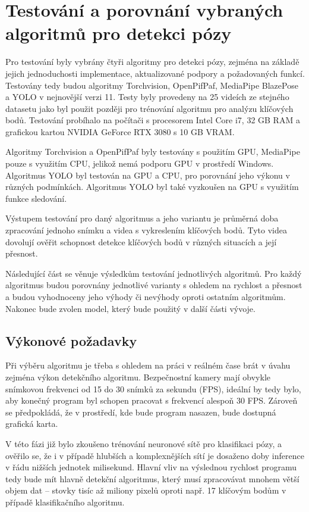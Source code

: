 \section{Testování a porovnání vybraných algoritmů pro detekci pózy}

Pro testování byly vybrány čtyři algoritmy pro detekci pózy, zejména na základě
jejich jednoduchosti implementace, aktualizované podpory a požadovaných funkcí.
Testovány tedy budou algoritmy Torchvision, OpenPifPaf, MediaPipe BlazePose a
YOLO v nejnovější verzi 11. Testy byly provedeny na 25 videích ze stejného
datasetu jako byl použit později pro trénování algoritmu pro analýzu klíčových
bodů. Testování probíhalo na počítači s procesorem Intel Core i7, 32 GB RAM a
grafickou kartou NVIDIA GeForce RTX 3080 s 10 GB VRAM.

Algoritmy Torchvision a OpenPifPaf byly testovány s použitím GPU, MediaPipe
pouze s využitím CPU, jelikož nemá podporu GPU v prostředí Windows. Algoritmus
YOLO byl testován na GPU a CPU, pro porovnání jeho výkonu v různých
podmínkách. Algoritmus YOLO byl také vyzkoušen na GPU s využitím funkce
sledování.

Výstupem testování pro daný algoritmus a jeho variantu je průměrná doba
zpracování jednoho snímku a videa s vykreslením klíčových bodů. Tyto videa
dovolují ověřit schopnost detekce klíčových bodů v různých situacích a její
přesnost.

Následující část se věnuje výsledkům testování jednotlivých algoritmů. Pro každý
algoritmus budou porovnány jednotlivé varianty s ohledem na rychlost a přesnost a
budou vyhodnoceny jeho výhody či nevýhody oproti ostatním algoritmům. Nakonec bude zvolen
model, který bude použitý v další části vývoje.

\subsection{Výkonové požadavky}
\label{sec:performance_requirements}

Při výběru algoritmu je třeba s ohledem na práci v reálném čase brát v úvahu
zejména výkon detekčního algoritmu. Bezpečnostní kamery mají obvykle snímkovou
frekvenci od 15 do 30 snímků za sekundu (FPS), ideální by tedy bylo, aby
konečný program byl schopen pracovat s frekvencí alespoň 30 FPS. Zároveň se
předpokládá, že v prostředí, kde bude program nasazen, bude dostupná grafická
karta.

V této fázi již bylo zkoušeno trénování neuronové sítě pro klasifikaci pózy, a
ověřilo se, že i v případě hlubších a komplexnějších sítí je dosaženo doby
inference v řádu nižších jednotek milisekund. Hlavní vliv na výslednou rychlost
programu tedy bude mít hlavně detekční algoritmus, který musí zpracovávat
mnohem větší objem dat – stovky tisíc až miliony pixelů oproti např. 17
klíčovým bodům v případě klasifikačního algoritmu.

